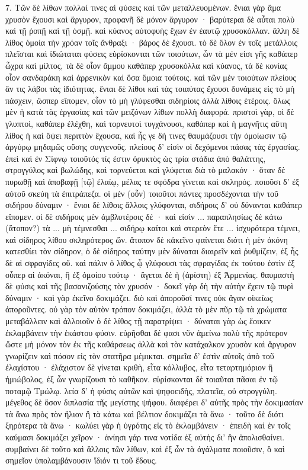 \documentclass[a4paper, 11pt, oneside, polutonikogreek, german]{article}
\begin{document}
7. Τῶν δὲ λίθων πολλαί τινες αἱ φύσεις καὶ τῶν μεταλλευομένων. ἔνιαι γὰρ ἅμα χρυσὸν ἔχουσι καὶ ἄργυρον, προφανῆ δὲ μόνον ἄργυρον · βαρύτεραι δὲ αὗται πολὺ καὶ τῇ ῥοπῇ καὶ τῇ ὀσμῇ. καὶ κύανος αὐτοφυὴς ἔχων ἐν ἑαυτῷ χρυσοκόλλαν. ἄλλη δὲ λίθος ὁμοία τὴν χρόαν τοῖς ἄνθραξι · βάρος δὲ ἔχουσι. τὸ δὲ ὅλον ἐν τοῖς μετάλλοις πλεῖσται καὶ ἰδιώταται φύσεις εὑρίσκονται τῶν τοιούτων, ὧν τὰ μέν εἰσι γῆς καθάπερ ὦχρα καὶ μίλτος, τὰ δὲ οἷον ἄμμου καθάπερ χρυσοκόλλα καὶ κύανος, τὰ δὲ κονίας οἷον σανδαράκη καὶ ἀρρενικὸν καὶ ὅσα ὅμοια τούτοις. καὶ τῶν μὲν τοιούτων πλείους ἄν τις λάβοι τὰς ἰδιότητας. ἔνιαι δὲ λίθοι καὶ τὰς τοιαύτας ἔχουσι δυνάμεις εἰς τὸ μὴ πάσχειν, ὥσπερ εἴπομεν, οἷον τὸ μὴ γλύφεσθαι σιδηρίοις ἀλλὰ λίθοις ἑτέροις. ὅλως μὲν ἡ κατὰ τὰς ἐργασίας καὶ τῶν μειζόνων λίθων πολλὴ διαφορά. πριστοὶ γὰρ, οἱ δὲ γλυπτοὶ, καθάπερ ἐλέχθη, καὶ τορνευτοὶ τυγχάνουσι, καθάπερ καὶ ἡ μαγνῆτις αὕτη λίθος ἡ καὶ ὄψει περιττὸν ἔχουσα, καὶ ἧς γε δή τινες θαυμάζουσι τὴν ὁμοίωσιν τῷ ἀργύρῳ μηδαμῶς οὔσης συγγενοῦς. πλείους δ' εἰσὶν οἱ δεχόμενοι πάσας τὰς ἐργασίας. ἐπεὶ καὶ ἐν Σίφνῳ τοιοῦτός τίς ἐστιν ὀρυκτὸς ὡς τρία στάδια ἀπὸ θαλάττης, στρογγύλος καὶ βωλώδης, καὶ τορνεύεται καὶ γλύφεται διὰ τὸ μαλακόν · ὅταν δὲ πυρωθῇ καὶ ἀποβαφῇ [τῷ] ἐλαίῳ, μέλας τε σφόδρα γίνεται καὶ σκληρός. ποιοῦσι δ' ἐξ αὐτοῦ σκεύη τὰ ἐπιτράπεζα. οἱ μὲν (οὖν) τοιοῦτοι πάντες προσδέχονται τὴν τοῦ σιδήρου δύναμιν · ἔνιοι δὲ λίθοις ἄλλοις γλύφονται, σιδήροις δ' οὐ δύνανται καθάπερ εἴπομεν. οἱ δὲ σιδήροις μὲν ἀμβλυτέροις δέ · καὶ εἰσὶν ... παραπλησίως δὲ κάτω (ἄτοπον?) τὰ ... μὴ τέμνεσθαι ... σιδήρῳ καίτοι καὶ στερεὸν ἕτε ... ἰσχυρότερα τέμνει, καὶ σίδηρος λίθου σκληρότερος ὤν. ἄτοπον δὲ κἀκεῖνο φαίνεται διότι ἡ μὲν ἀκόνη κατεσθίει τὸν σίδηρον, ὁ δὲ σίδηρος ταύτην μὲν δύναται διαιρεῖν καὶ ῥυθμίζειν, ἐξ ἧς δὲ αἱ σφραγίδες οὔ. καὶ πάλιν ὁ λίθος ᾧ γλύφουσι τὰς σφραγίδας ἐκ τούτου ἐστὶν ἐξ οὗπερ αἱ ἀκόναι, ἢ ἐξ ὁμοίου τούτῳ · ἄγεται δὲ ἡ (ἀρίστη) ἐξ Ἀρμενίας. θαυμαστὴ δὲ φύσις καὶ τῆς βασανιζούσης τὸν χρυσόν · δοκεῖ γὰρ δὴ τὴν αὐτὴν ἔχειν τῷ πυρὶ δύναμιν · καὶ γὰρ ἐκεῖνο δοκιμάζει. διὸ καὶ ἀποροῦσί τινες οὐκ ἄγαν οἰκείως ἀποροῦντες. οὐ γὰρ τὸν αὐτὸν τρόπον δοκιμάζει, ἀλλὰ τὸ μὲν πῦρ τῷ τὰ χρώματα μεταβάλλειν καὶ ἀλλοιοῦν ὁ δὲ λίθος τῇ παρατρίψει · δύναται γὰρ ὡς ἔοικεν ἐκλαμβάνειν τὴν ἑκάστου φύσιν. εὑρῆσθαι δέ φασι νῦν ἀμείνω πολὺ τῆς πρότερον ὥστε μὴ μόνον τὸν ἐκ τῆς καθάρσεως ἀλλὰ καὶ τὸν κατάχαλκον χρυσὸν καὶ ἄργυρον γνωρίζειν καὶ πόσον εἰς τὸν στατῆρα μέμικται. σημεῖα δ' ἐστὶν αὐτοῖς ἀπὸ τοῦ ἐλαχίστου · ἐλάχιστον δὲ γίνεται κριθὴ, εἶτα κόλλυβος, εἶτα τεταρτημόριον ἢ ἡμιώβολος, ἐξ ὧν γνωρίζουσι τὸ καθῆκον. εὑρίσκονται δὲ τοιαῦται πᾶσαι ἐν τῷ ποταμῷ Τμώλῳ. λεία δ' ἡ φύσις αὐτῶν καὶ ψηφοειδὴς, πλατεῖα, οὐ στρογγύλη. μέγεθος δὲ ὅσον διπλασία τῆς μεγίστης ψήφου. διαφέρει δ' αὐτῆς πρὸς τὴν δοκιμασίαν τὰ ἄνω πρὸς τὸν ἥλιον ἢ τὰ κάτω καὶ βέλτιον δοκιμάζει τὰ ἄνω · τοῦτο δὲ διότι ξηρότερα τὰ ἄνω · κωλύει γὰρ ἡ ὑγρότης εἰς τὸ ἐκλαμβάνειν · ἐπειδὴ καὶ ἐν τοῖς καύμασι δοκιμάζει χεῖρον · ἀνίησι γάρ τινα νοτίδα ἐξ αὐτὴς δι' ἣν ἀπολισθαίνει. συμβαίνει δὲ τοῦτο καὶ ἄλλοις τῶν λίθων, καὶ ἐξ ὧν τὰ ἀγάλματα ποιοῦσιν, ὃ καὶ σημεῖον ὑπολαμβάνουσιν ἴδιόν τι τοῦ ἕδους.
\end{document}
